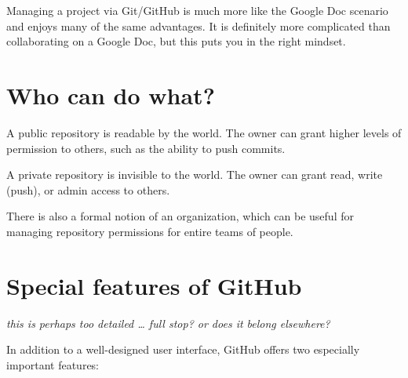 \documentclass[
]{book}
\begin{document}
Managing a project via Git/GitHub is much more like the Google Doc scenario and enjoys many of the same advantages. It is definitely more complicated than collaborating on a Google Doc, but this puts you in the right mindset.

\section{Who can do what?}\label{who-can-do-what}

A public repository is readable by the world. The owner can grant higher levels of permission to others, such as the ability to push commits.

A private repository is invisible to the world. The owner can grant read, write (push), or admin access to others.

There is also a formal notion of an organization, which can be useful for managing repository permissions for entire teams of people.

\section{Special features of GitHub}\label{special-features-of-github}

\emph{this is perhaps too detailed \ldots{} full stop? or does it belong elsewhere?}

In addition to a well-designed user interface, GitHub offers two especially important features:
\end{document}
